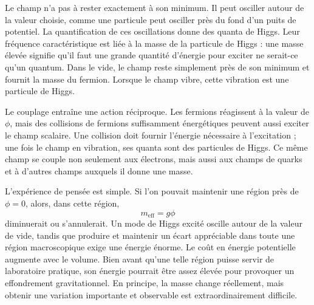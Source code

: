 Le champ n’a pas à rester exactement à son minimum. Il peut osciller autour de la valeur choisie, comme une particule peut osciller près du fond d’un puits de potentiel. La quantification de ces oscillations donne des quanta de Higgs. Leur fréquence caractéristique est liée à la masse de la particule de Higgs : une masse élevée signifie qu’il faut une grande quantité d’énergie pour exciter ne serait-ce qu’un quantum. Dans le vide, le champ reste simplement près de son minimum et fournit la masse du fermion. Lorsque le champ vibre, cette vibration est une particule de Higgs.

Le couplage entraîne une action réciproque. Les fermions réagissent à la valeur de \(\phi\), mais des collisions de fermions suffisamment énergétiques peuvent aussi exciter le champ scalaire. Une collision doit fournir l’énergie nécessaire à l’excitation ; une fois le champ en vibration, ses quanta sont des particules de Higgs. Ce même champ se couple non seulement aux électrons, mais aussi aux champs de quarks et à d’autres champs auxquels il donne une masse.

\begin{classroomqa}
\end{classroomqa}

L’expérience de pensée est simple. Si l’on pouvait maintenir une région près de \(\phi=0\), alors, dans cette région,
\begin{equation}
m_{\mathrm{eff}}=g\phi
\end{equation}
diminuerait ou s’annulerait. Un mode de Higgs excité oscille autour de la valeur de vide, tandis que produire et maintenir un écart appréciable dans toute une région macroscopique exige une énergie énorme. Le coût en énergie potentielle augmente avec le volume. Bien avant qu’une telle région puisse servir de laboratoire pratique, son énergie pourrait être assez élevée pour provoquer un effondrement gravitationnel. En principe, la masse change réellement, mais obtenir une variation importante et observable est extraordinairement difficile.

\begin{classroomqa}
\end{classroomqa}

